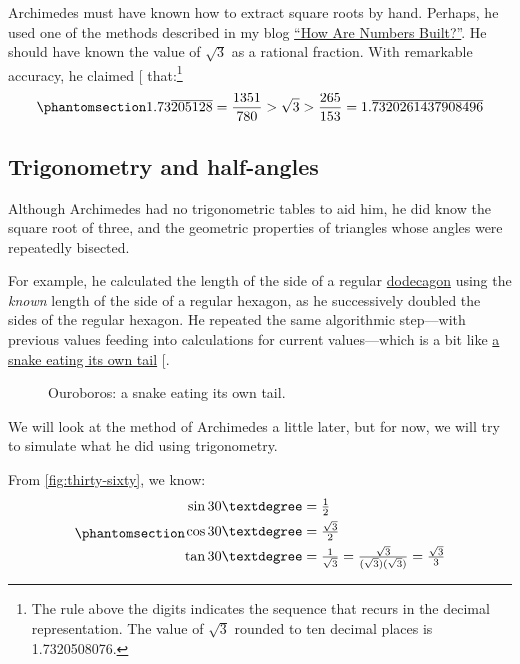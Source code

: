 \documentclass[
  a4paper,
]{article}
\begin{document}
Archimedes must have known how to extract square roots by hand. Perhaps,
he used one of the methods described in my blog
\href{https://swanlotus.netlify.app/blogs/how-are-numbers-built}{``How
Are Numbers Built?''}. He should have known the value of \(\sqrt{3}\) as
a rational fraction. With remarkable accuracy, he claimed
{[}\citeproc{ref-heath2002}{4}{]} that:\footnote{The rule above the
  digits indicates the sequence that recurs in the decimal
  representation. The value of \(\sqrt{3}\) rounded to ten decimal
  places is 1.7320508076.}
\begin{equation}\phantomsection\label{eq:sqrt3}{
1.73\overline{205128} = \frac{1351}{780} > \sqrt{3} > \frac{265}{153} = 1.\overline{7320261437908496}
}\end{equation}

\subsection{Trigonometry and
half-angles}\label{trigonometry-and-half-angles}

Although Archimedes had no trigonometric tables to aid him, he did know
the square root of three, and the geometric properties of triangles
whose angles were repeatedly bisected.

For example, he calculated the length of the side of a regular
\href{https://en.wikipedia.org/wiki/Dodecagon}{dodecagon} using the
\emph{known} length of the side of a regular hexagon, as he successively
doubled the sides of the regular hexagon. He repeated the same
algorithmic step---with previous values feeding into calculations for
current values---which is a bit like
\href{https://www.bbc.com/culture/article/20171204-the-ancient-symbol-that-spanned-millennia}{a
snake eating its own tail} {[}\citeproc{ref-ouroboros}{5}{]}.

\begin{figure}
\centering

\caption[Ouroboros: a snake eating its own tail.]{Ouroboros: a snake
eating its own tail.\footnotemark{}}\label{fig:ouroboros}
\end{figure}

We will look at the method of Archimedes a little later, but for now, we
will try to simulate what he did using trigonometry.

From \cref{fig:thirty-sixty}, we know:
\begin{equation}\phantomsection\label{eq:three-six-nine}{
\begin{aligned}
\sin 30° &= \tfrac{1}{2}\\
\cos 30° &= \tfrac{\sqrt{3}}{2}\\
\tan 30° &= \tfrac{1}{\sqrt{3}} = \tfrac{\sqrt{3}}{(\sqrt{3})(\sqrt{3})} = \tfrac{\sqrt{3}}{3}\\
\end{aligned}
}\end{equation}
\end{document}
